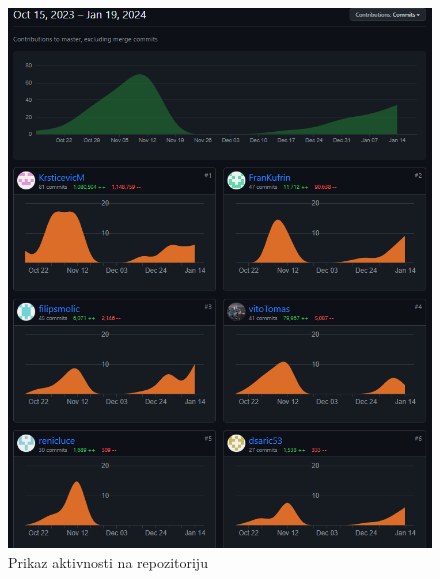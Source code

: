 		
		
		\begin{figure}[H]
			\includegraphics[width=\textwidth]{dijagramaktivnostinarepo.PNG}
			\centering
			\caption{Prikaz aktivnosti na repozitoriju}
			\label{fig:aktivnost}
		\end{figure}
	